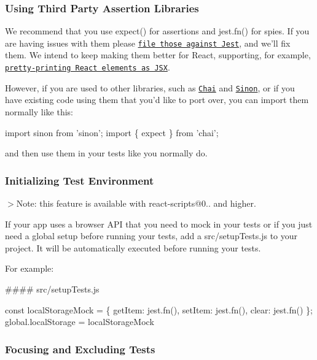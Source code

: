 \subsubsection*{Using Third Party Assertion Libraries}

We recommend that you use {\ttfamily expect()} for assertions and {\ttfamily jest.\+fn()} for spies. If you are having issues with them please \href{https://github.com/facebook/jest/issues/new}{\tt file those against Jest}, and we’ll fix them. We intend to keep making them better for React, supporting, for example, \href{https://github.com/facebook/jest/pull/1566}{\tt pretty-\/printing React elements as J\+SX}.

However, if you are used to other libraries, such as \href{http://chaijs.com/}{\tt Chai} and \href{http://sinonjs.org/}{\tt Sinon}, or if you have existing code using them that you’d like to port over, you can import them normally like this\+:


\begin{DoxyCode}
import sinon from 'sinon';
import \{ expect \} from 'chai';
\end{DoxyCode}


and then use them in your tests like you normally do.

\subsubsection*{Initializing Test Environment}

$>$Note\+: this feature is available with {\ttfamily react-\/scripts@0..} and higher.

If your app uses a browser A\+PI that you need to mock in your tests or if you just need a global setup before running your tests, add a {\ttfamily src/setup\+Tests.\+js} to your project. It will be automatically executed before running your tests.

For example\+:

\#\#\#\# {\ttfamily src/setup\+Tests.\+js} 
\begin{DoxyCode}
const localStorageMock = \{
  getItem: jest.fn(),
  setItem: jest.fn(),
  clear: jest.fn()
\};
global.localStorage = localStorageMock
\end{DoxyCode}


\subsubsection*{Focusing and Excluding Tests}

